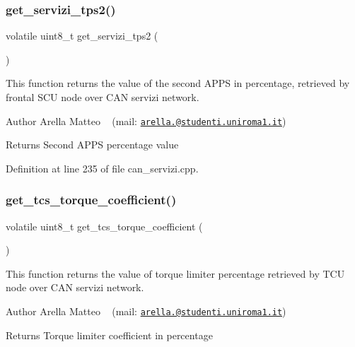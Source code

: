 \subsubsection{\texorpdfstring{get\+\_\+servizi\+\_\+tps2()}{get\_servizi\_tps2()}}
{\footnotesize\ttfamily volatile uint8\+\_\+t get\+\_\+servizi\+\_\+tps2 (\begin{DoxyParamCaption}{ }\end{DoxyParamCaption})}



This function returns the value of the second A\+P\+PS in percentage, retrieved by frontal S\+CU node over C\+AN servizi network. 

\begin{DoxyAuthor}{Author}
Arella Matteo ~\newline
 (mail\+: \href{mailto:arella.1646983@studenti.uniroma1.it}{\tt arella.@studenti.\+uniroma1.\+it})
\end{DoxyAuthor}
\begin{DoxyReturn}{Returns}
Second A\+P\+PS percentage value 
\end{DoxyReturn}


Definition at line 235 of file can\+\_\+servizi.\+cpp.

\mbox{\label{group___c_a_n__servizi__group_ga68bca94de95a77a3366f46eed661193f}} 
\subsubsection{\texorpdfstring{get\+\_\+tcs\+\_\+torque\+\_\+coefficient()}{get\_tcs\_torque\_coefficient()}}
{\footnotesize\ttfamily volatile uint8\+\_\+t get\+\_\+tcs\+\_\+torque\+\_\+coefficient (\begin{DoxyParamCaption}{ }\end{DoxyParamCaption})}



This function returns the value of torque limiter percentage retrieved by T\+CU node over C\+AN servizi network. 

\begin{DoxyAuthor}{Author}
Arella Matteo ~\newline
 (mail\+: \href{mailto:arella.1646983@studenti.uniroma1.it}{\tt arella.@studenti.\+uniroma1.\+it})
\end{DoxyAuthor}
\begin{DoxyReturn}{Returns}
Torque limiter coefficient in percentage 
\end{DoxyReturn}


